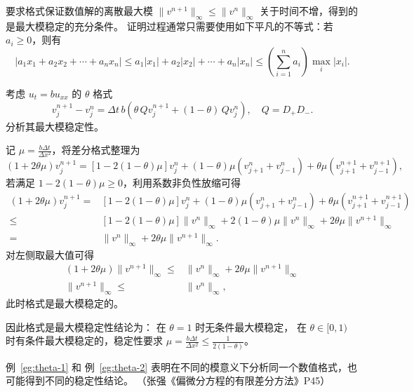 要求格式保证数值解的离散最大模 $\| v^{n+1}\|_\infty \le \| v^{n}\|_\infty$ 关于时间不增，得到的是最大模稳定的充分条件。
证明过程通常只需要使用如下平凡的不等式：若 $a_i \ge 0$，则有
\[
    |a_1 x_1 + a_2 x_2 + \cdots + a_n x_n | \le a_1 | x_1 | + a_2 | x_2 | + \cdots + a_n | x_n |
    \le \left(\sum_{i=1}^n a_i \right)\max_i |x_i|.
\]


\begin{example}\label{eg:theta-2}
    考虑 $u_t = b u_{xx}$ 的 $\theta$ 格式
    \[
        v^{n+1}_j - v^n_j = \Delta t\,b (\theta\,Q v^{n+1}_j+(1-\theta)\, Q v^n_j),\quad Q = D_+ D_-.
    \]
    分析其最大模稳定性。
\end{example}

\begin{solution*}
    记 $\mu = \frac{b \Delta t}{\Delta x^2}$，将差分格式整理为
    \[
        (1 + 2 \theta \mu) v_j^{n+1}
        = \left[1-2(1-\theta) \mu \right] v_j^n + (1-\theta) \mu (v_{j+1}^{n} + v_{j-1}^{n}) + \theta \mu (v_{j+1}^{n+1} + v_{j-1}^{n+1}),
    \]
    若满足 $1-2(1-\theta) \mu \ge 0$，利用系数非负性放缩可得
    \begin{align*}
        (1 + 2 \theta \mu) v_j^{n+1}
        ={}   & \left[1-2(1-\theta) \mu \right] v_j^n + (1-\theta) \mu (v_{j+1}^{n} + v_{j-1}^{n}) + \theta \mu (v_{j+1}^{n+1} + v_{j-1}^{n+1}) \\
        \le{} & \left[1-2(1-\theta) \mu \right] \|v^n \|_{\infty} + 2 (1-\theta) \mu \|v^n \|_{\infty}
        + 2 \theta \mu \|v^{n+1}\|_{\infty}                                                                                                     \\
        ={}   & \|v^n\|_{\infty} + 2 \theta \mu \|v^{n+1}\|_{\infty}.
    \end{align*}
    对左侧取最大值可得
    \begin{align*}
        (1 + 2 \theta \mu)\|v^{n+1}\|_{\infty} \le{} & \|v^n\|_{\infty} + 2 \theta \mu \|v^{n+1}\|_{\infty} \\
        \|v^{n+1}\|_{\infty} \le{}                   & \|v^n\|_{\infty},
    \end{align*}
    此时格式是最大模稳定的。

    因此格式是最大模稳定性结论为：
    在 $\theta=1$ 时无条件最大模稳定，
    在 $\theta \in [0,1)$ 时有条件最大模稳定的，稳定性要求 $\mu = \frac{b \Delta t}{\Delta x^2} \le \frac{1}{2(1-\theta)}$。
\end{solution*}

\begin{remark}
    例~\ref{eg:theta-1} 和 例~\ref{eg:theta-2} 表明在不同的模意义下分析同一个数值格式，也可能得到不同的稳定性结论。
    （张强《偏微分方程的有限差分方法》P45）
\end{remark}

